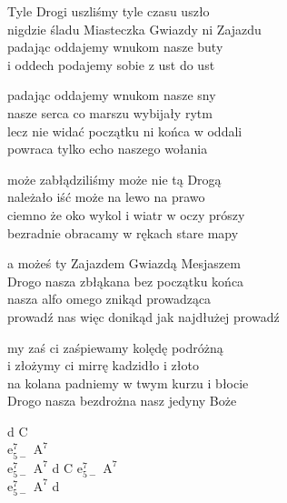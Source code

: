 \begin{textn}
    Tyle Drogi uszliśmy tyle czasu uszło\\
    nigdzie śladu Miasteczka Gwiazdy ni Zajazdu\\
    padając oddajemy wnukom nasze buty\\
    i oddech podajemy sobie z ust do ust

    padając oddajemy wnukom nasze sny\\
    nasze serca co marszu wybijały rytm\\
    lecz nie widać początku ni końca w oddali\\
    powraca tylko echo naszego wołania

    może zabłądziliśmy może nie tą Drogą\\
    należało iść może na lewo na prawo\\
    ciemno że oko wykol i wiatr w oczy prószy\\
    bezradnie obracamy w rękach stare mapy

    a możeś ty Zajazdem Gwiazdą Mesjaszem\\
    Drogo nasza zbłąkana bez początku końca\\
    nasza alfo omego znikąd prowadząca\\
    prowadź nas więc donikąd jak najdłużej prowadź

    my zaś ci zaśpiewamy kolędę podróżną\\
    i złożymy ci mirrę kadzidło i złoto\\
    na kolana padniemy w twym kurzu i błocie\\
    Drogo nasza bezdrożna nasz jedyny Boże
\end{textn}
\begin{chordw}
    d C\\
    $\mathrm{e_{5-}^{7}}$ $\mathrm{A^{7}}$\\
    $\mathrm{e_{5-}^{7}}$ $\mathrm{A^{7}}$ d C $\mathrm{e_{5-}^{7}}$ $\mathrm{A^{7}}$\\
    $\mathrm{e_{5-}^{7}}$ $\mathrm{A^{7}}$ d
\end{chordw}
